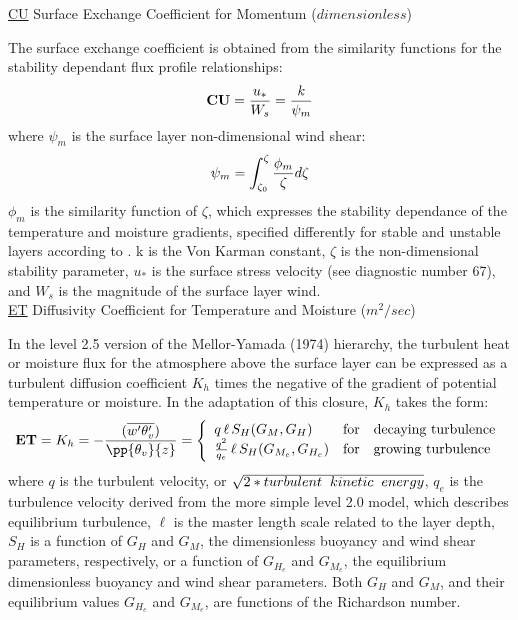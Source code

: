 \noindent
{ \underline {CU}  Surface Exchange Coefficient for Momentum ($dimensionless$) }

\noindent
The surface exchange coefficient is obtained from the similarity functions for the stability
 dependant flux profile relationships:
\[
{\bf CU} = {u_* \over W_s} = { k \over \psi_{m} } 
\]
where $\psi_m$ is the surface layer non-dimensional wind shear: 
\[
\psi_{m} = {\int_{\zeta_{0}}^{\zeta} {\phi_{m} \over \zeta} d \zeta}
\]
\noindent
$\phi_m$ is the similarity function of $\zeta$, which expresses the stability dependance of
the temperature and moisture gradients, specified differently for stable and unstable layers
according to \cite{helfschu:95}. k is the Von Karman constant, $\zeta$ is the 
non-dimensional stability parameter, $u_*$ is the surface stress velocity 
(see diagnostic number 67), and $W_s$ is the magnitude of the surface layer wind.
\\

\noindent
{ \underline {ET}  Diffusivity Coefficient for Temperature and Moisture ($m^2/sec$) }

\noindent
In the level 2.5 version of the Mellor-Yamada (1974) hierarchy, the turbulent heat or
moisture flux for the atmosphere above the surface layer can be expressed as a turbulent 
diffusion coefficient $K_h$ times the negative of the gradient of potential temperature 
or moisture. In the \cite{helflab:88} adaptation of this closure, $K_h$ 
takes the form:
\[
{\bf ET} = K_h = -{( {\overline{w^{\prime}\theta_v^{\prime}}}) \over {\pp{\theta_v}{z}} }
 = \left\{ \begin{array}{l@{\quad\mbox{for}\quad}l} q \, \ell \, S_H(G_M,G_H) & \mbox{decaying turbulence}
\\ { q^2 \over {q_e} } \, \ell \, S_{H}(G_{M_e},G_{H_e}) & \mbox{growing turbulence} \end{array} \right.
\]
where $q$ is the turbulent velocity, or $\sqrt{2*turbulent \hspace{.2cm} kinetic \hspace{.2cm} 
energy}$, $q_e$ is the turbulence velocity derived from the more simple level 2.0 model, 
which describes equilibrium turbulence, $\ell$ is the master length scale related to the layer 
depth, 
$S_H$ is a function of $G_H$ and $G_M$, the dimensionless buoyancy and
wind shear parameters, respectively, or a function of $G_{H_e}$ and $G_{M_e}$, the equilibrium 
dimensionless buoyancy and wind shear
parameters.   Both $G_H$ and $G_M$, and their equilibrium values $G_{H_e}$ and $G_{M_e}$, 
are functions of the Richardson number.

